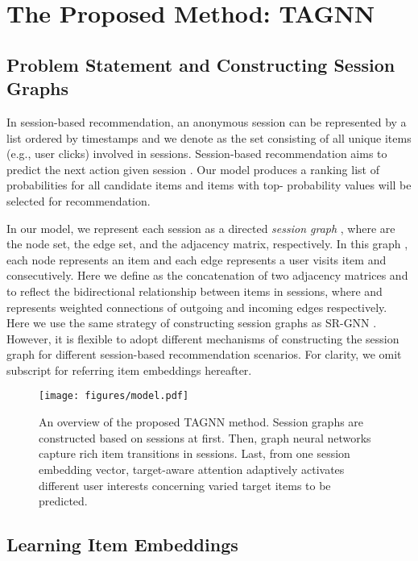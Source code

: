 \documentclass[sigconf]{acmart}
\begin{document}
 \section{The Proposed Method: TAGNN}

\subsection{Problem Statement and Constructing Session Graphs}

In session-based recommendation, an anonymous session can be represented by a list  ordered by timestamps and we denote  as the set consisting of all unique items (e.g., user clicks) involved in sessions. Session-based recommendation aims to predict the next action  given session . Our model produces a ranking list of probabilities for all candidate items and items with top- probability values will be selected for recommendation.

In our model, we represent each session  as a directed \emph{session graph} , where  are the node set, the edge set, and the adjacency matrix, respectively. In this graph , each node represents an item  and each edge  represents a user visits item  and  consecutively. Here we define  as the concatenation of two adjacency matrices  and  to reflect the bidirectional relationship between items in sessions, where  and  represents weighted connections of outgoing and incoming edges respectively.
Here we use the same strategy of constructing session graphs as SR-GNN \cite{Wu:2019ke}. However, it is flexible to adopt different mechanisms of constructing the session graph for different session-based recommendation scenarios.
For clarity, we omit subscript  for referring item embeddings hereafter.

\begin{figure}
	\centering
	\texttt{[image: figures/model.pdf]}
	\caption{An overview of the proposed TAGNN method. Session graphs are constructed based on sessions at first. Then, graph neural networks capture rich item transitions in sessions. Last, from one session embedding vector, target-aware attention adaptively activates different user interests concerning varied target items to be predicted.}
	\label{fig:model}
\end{figure}

\subsection{Learning Item Embeddings}
\end{document}
